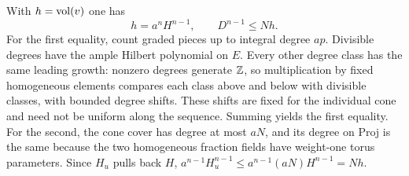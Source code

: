 With $h=\operatorname{vol}(v)$ one has
\begin{equation}\label{cone:volume}
 h=a^n H^{n-1},\qquad D^{n-1}\leq Nh.
\end{equation}
For the first equality, count graded pieces up to integral degree $ap$.
Divisible degrees have the ample Hilbert polynomial on $E$.  Every
other degree class has the same leading growth: nonzero degrees generate
$\mathbb Z$, so multiplication by fixed homogeneous elements compares each
class above and below with divisible classes, with bounded degree
shifts.  These shifts are fixed for the individual cone and need not be
uniform along the sequence.  Summing yields the first equality.
For the second, the cone cover has degree at most $aN$, and its degree
on Proj is the same because the two homogeneous fraction fields have
weight-one torus parameters.  Since $H_u$ pulls back $H$,
$a^{n-1}H_u^{n-1}\leq a^{n-1}(aN)H^{n-1}=Nh$.
